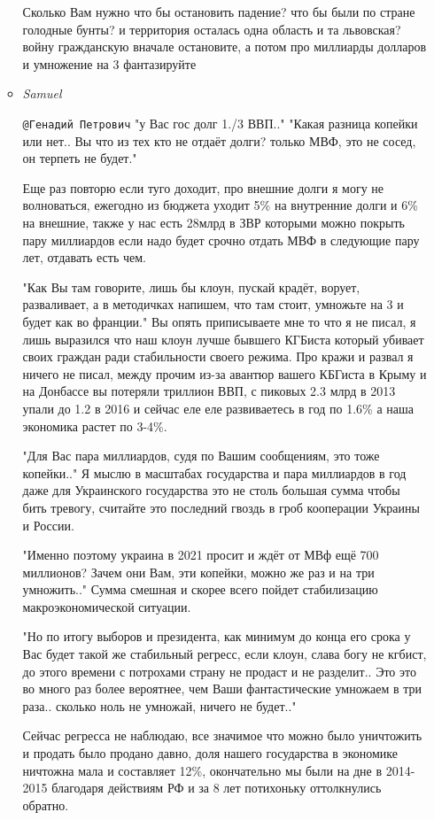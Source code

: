 \begin{itemize}
\begin{itemize}
Сколько Вам нужно что бы остановить падение? что бы были по стране голодные
бунты? и территория осталась одна область и та львовская?  войну гражданскую
вначале остановите, а потом про миллиарды долларов и умножение на 3
фантазируйте


\item \emph{Samuel}

\verb|@Генадий Петрович|  "у Вас гос долг 1./3 ВВП.."  "Какая разница копейки
или нет.. Вы что из тех кто не отдаёт долги? только МВФ, это не сосед, он
терпеть не будет."

Еще раз повторю если туго доходит, про внешние долги я могу не волноваться,
ежегодно из бюджета уходит 5\% на внутренние долги и 6\% на внешние, также у нас
есть 28млрд в ЗВР которыми можно покрыть пару миллиардов если надо будет срочно
отдать МВФ в следующие пару лет, отдавать есть чем. 

"Как Вы там говорите, лишь бы клоун, пускай крадёт, ворует, разваливает, а в
методичках напишем, что там стоит, умножьте на 3 и будет как во франции." Вы
опять приписываете мне то что я не писал, я лишь выразился что наш клоун лучше
бывшего КГБиста который убивает своих граждан ради стабильности своего режима.
Про кражи и развал я ничего не писал, между прочим из-за авантюр вашего КБГиста
в Крыму и на Донбассе вы потеряли триллион ВВП, с пиковых 2.3 млрд в 2013 упали
до 1.2 в 2016 и сейчас еле еле развиваетесь в год по 1.6\% а наша экономика
растет по 3-4\%. 

"Для Вас пара миллиардов, судя по Вашим сообщениям, это тоже копейки.." Я мыслю
в масштабах государства и пара миллиардов в год даже для Украинского
государства это не столь большая сумма чтобы бить тревогу, считайте это
последний гвоздь в гроб кооперации Украины и России. 

"Именно поэтому украина в 2021 просит и ждёт от МВф ещё 700 миллионов? Зачем
они Вам, эти копейки, можно же раз и на три умножить.." Сумма смешная и скорее
всего пойдет стабилизацию макроэкономической ситуации. 

"Но по итогу выборов и президента, как минимум до конца его срока у Вас будет
такой же стабильный регресс, если клоун, слава богу не кгбист, до этого времени
с потрохами страну не продаст и не разделит.. Это это во много раз более
вероятнее, чем Ваши фантастические умножаем в три раза.. сколько ноль не
умножай, ничего не будет.." 

Сейчас регресса не наблюдаю, все значимое что можно было уничтожить и продать
было продано давно, доля нашего государства в экономике ничтожна мала и
составляет 12\%, окончательно мы были на дне в 2014-2015 благодаря действиям РФ
и за 8 лет потихоньку оттолкнулись обратно. 


\end{itemize}
\end{itemize}
